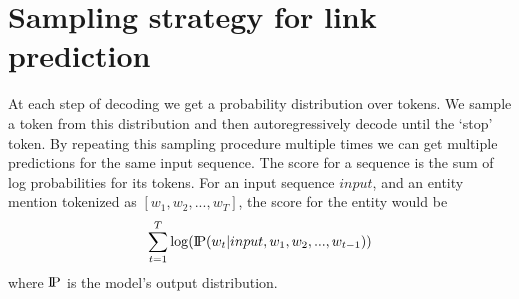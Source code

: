 \documentclass[11pt]{article}
\renewcommand\:{\colon} \newcommand{\sset}[1]{\left\{\,#1\,\right\}} \newcommand{\ssets}[1]{\left\{#1\right\}} \newcommand{\ssetn}[1]{\{\,#1\,\}}
\newcommand{\probP}{\text{I\kern-0.15em P}}
\begin{document}
\section{Sampling strategy for link prediction}
\label{sec:sampling_appendix}
At each step of decoding we get a probability distribution over tokens. We sample a token from this distribution and then autoregressively decode until the `stop' token. By repeating this sampling procedure multiple times we can get multiple predictions for the same input sequence. The score for a sequence is the sum of log probabilities for its tokens. For an input sequence $input$, and an entity mention tokenized as $[w_1, w_2, ..., w_T]$, the score for the entity would be
\begin{equation*}
\begin{aligned}
\sum_{t=1}^T \log(\probP(w_t | input, w_1, w_2, ..., w_{t-1}))
\end{aligned}
\end{equation*}
where $\probP$ is the model's output distribution.
\end{document}

